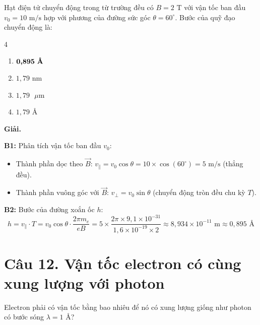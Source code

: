 \documentclass[11pt,a4paper]{article}
\begin{document}
Hạt điện tử chuyển động trong từ trường đều có $B = 2\text{ T}$ với vận tốc ban đầu $v_0 = 10\text{ m/s}$ hợp với phương của đường sức góc $\theta = 60^\circ$. Bước của quỹ đạo chuyển động là:

\begin{multicols}{4}
\begin{enumerate}[label=\Alph*., itemsep=1pt, topsep=1pt, parsep=0pt, leftmargin=1.8em]
    \item $\boldsymbol{0{,}895\text{ \textbf{\AA}}}$
    \item $1{,}79\text{ nm}$
    \item $1{,}79\text{ }\mu\text{m}$
    \item $1{,}79\text{ \AA}$
\end{enumerate}
\end{multicols}

\textbf{Giải.}

\textbf{B1:} Phân tích vận tốc ban đầu $v_0$:
\begin{itemize}[label=\textbullet, leftmargin=1.5em, itemsep=1pt, topsep=1pt, parsep=0pt]
    \item Thành phần dọc theo $\vec{B}$: $v_\parallel = v_0 \cos\theta = 10 \times \cos(60^\circ) = 5\text{ m/s}$ (thẳng đều).
    \item Thành phần vuông góc với $\vec{B}$: $v_\perp = v_0 \sin\theta$ (chuyển động tròn đều chu kỳ $T$).
\end{itemize}

\textbf{B2:} Bước của đường xoắn ốc $h$:
\begin{equation*}
    h = v_\parallel \cdot T = v_0 \cos\theta \cdot \frac{2\pi m_e}{eB} = 5 \times \frac{2\pi \times 9{,}1 \times 10^{-31}}{1{,}6 \times 10^{-19} \times 2} \approx 8{,}934 \times 10^{-11}\text{ m} \approx 0{,}895\text{ \AA}
\end{equation*}

\vspace{0.5cm}

\section*{Câu 12. Vận tốc electron có cùng xung lượng với photon}

Electron phải có vận tốc bằng bao nhiêu để nó có xung lượng giống như photon có bước sóng $\lambda = 1\text{ \AA}$?
\end{document}
